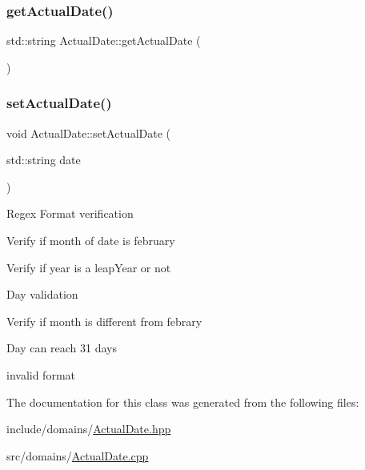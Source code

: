 \subsubsection{\texorpdfstring{getActualDate()}{getActualDate()}}
{\footnotesize\ttfamily std\+::string Actual\+Date\+::get\+Actual\+Date (\begin{DoxyParamCaption}{ }\end{DoxyParamCaption})}

\mbox{\label{class_actual_date_a5c09dc7cd8e5c71e6550f1a4f821dc80}} 
\subsubsection{\texorpdfstring{setActualDate()}{setActualDate()}}
{\footnotesize\ttfamily void Actual\+Date\+::set\+Actual\+Date (\begin{DoxyParamCaption}\item[{std\+::string}]{date }\end{DoxyParamCaption})}

Regex Format verification

Verify if month of date is february

Verify if year is a leap\+Year or not

Day validation

Verify if month is different from febrary

Day can reach 31 days

invalid format 

The documentation for this class was generated from the following files\+:\begin{DoxyCompactItemize}
\item 
include/domains/\mbox{\hyperlink{_actual_date_8hpp}{Actual\+Date.\+hpp}}\item 
src/domains/\mbox{\hyperlink{_actual_date_8cpp}{Actual\+Date.\+cpp}}\end{DoxyCompactItemize}
